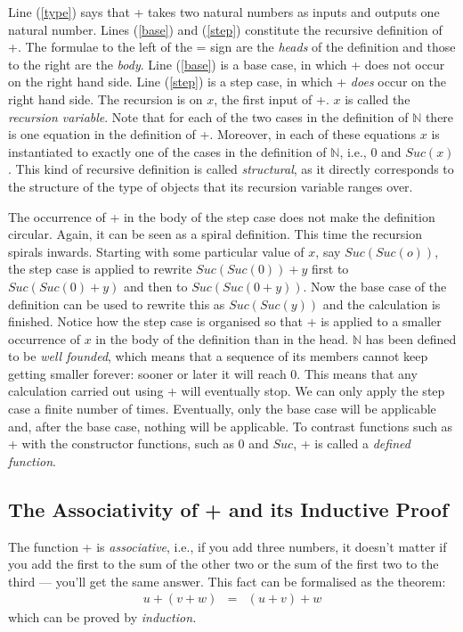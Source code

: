 \documentclass[twocolumn]{article}
\newcommand{\nat}{\mathbb{N}}
\begin{document}
Line (\ref{type}) says that + takes two natural numbers as inputs and
outputs one natural number. Lines (\ref{base}) and (\ref{step}) constitute the
recursive definition of +. The formulae to the left of the = sign are the {\em heads}
of the definition and those to the right are the {\em body}.  Line (\ref{base})
is a base case, in which + does not occur on the right hand side. Line
(\ref{step}) is a step case, in which + {\em does} occur on the right hand side.
The recursion is on $x$, the first input of +.  $x$ is called the {\em recursion
  variable}.  Note that for each of the two cases in the definition of $\nat$ there
is one equation in the definition of +. Moreover, in each of these equations $x$
is instantiated to exactly one of the cases in the definition of $\nat$, i.e., $0$
and $Suc(x)$. This kind of recursive definition is called {\em structural}, as it
directly corresponds to the structure of the type of objects that its recursion
variable ranges over.

The occurrence of + in the body of the step case does not make the definition
circular. Again, it can be seen as a spiral definition. This time the recursion
spirals inwards. Starting with some particular value of $x$, say $Suc(Suc(o))$, the
step case is applied to rewrite $Suc(Suc(0))+y$ first to $Suc(Suc(0)+y)$ and then to
$Suc(Suc(0+y))$. Now the base case of the definition can be used to rewrite this as
$Suc(Suc(y))$ and the calculation is finished. Notice how the step case is organised
so that + is applied to a smaller occurrence of $x$ in the body of the
definition than in the head. $\nat$ has been defined to be {\em well founded},
which means that a sequence of its members cannot keep getting smaller forever:
sooner or later it will reach 0. This means that any calculation carried out
using + will eventually stop. We can only apply the step case a finite number of
times. Eventually, only the base case will be applicable and, after the base
case, nothing will be applicable. To contrast functions such as + with the
constructor functions, such as 0 and $Suc$, + is called a {\em defined function}.

\subsection{The Associativity of + and its Inductive Proof}
\label{assoc-proof}

The function + is {\em associative}, i.e., if you add three numbers, it doesn't
matter if you add the first to the sum of the other two or the sum of the first
two to the third --- you'll get the same answer. This fact can be formalised as
the theorem:
\begin{eqnarray}
 u+(v+w) & = & (u+v)+w \label{assoc}
\end{eqnarray}
which can be proved by {\em induction.}
\end{document}
